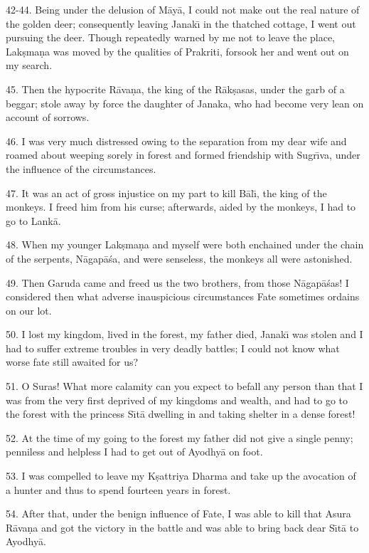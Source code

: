 42-44. Being under the delusion of M\=ay\=a, I could not make out the real nature of the golden deer; consequently leaving Janak\={\i} in the thatched cottage, I went out pursuing the deer. Though repeatedly warned by me not to leave the place, Lak\d{s}ma\d{n}a was moved by the qualities of Prakriti, forsook her and went out on my search.

45. Then the hypocrite R\=ava\d{n}a, the king of the R\=ak\d{s}asas, under the garb of a beggar; stole away by force the daughter of Janaka, who had become very lean on account of sorrows.

46. I was very much distressed owing to the separation from my dear wife and roamed about weeping sorely in forest and formed friendship with Sugr\={\i}va, under the influence of the circumstances.

47. It was an act of gross injustice on my part to kill B\=al\={\i}, the king of the monkeys. I freed him from his curse; afterwards, aided by the monkeys, I had to go to Lank\=a.

48. When my younger Lak\d{s}ma\d{n}a and myself were both enchained under the chain of the serpents, N\=agap\=a\'sa, and were senseless, the monkeys all were astonished.

49. Then Garuda came and freed us the two brothers, from those N\=agap\=a\'sas! I considered then what adverse inauspicious circumstances Fate sometimes ordains on our lot.

50. I lost my kingdom, lived in the forest, my father died, Janak\={\i} was stolen and I had to suffer extreme troubles in very deadly battles; I could not know what worse fate still awaited for us?

51. O Suras! What more calamity can you expect to befall any person than that I was from the very first deprived of my kingdoms and wealth, and had to go to the forest with the princess S\={\i}t\=a dwelling in and taking shelter in a dense forest!

52. At the time of my going to the forest my father did not give a single penny; penniless and helpless I had to get out of Ayodhy\=a on foot.

53. I was compelled to leave my K\d{s}attriya Dharma and take up the avocation of a hunter and thus to spend fourteen years in forest.

54. After that, under the benign influence of Fate, I was able to kill that Asura R\=ava\d{n}a and got the victory in the battle and was able to bring back dear S\={\i}t\=a to Ayodhy\=a.

